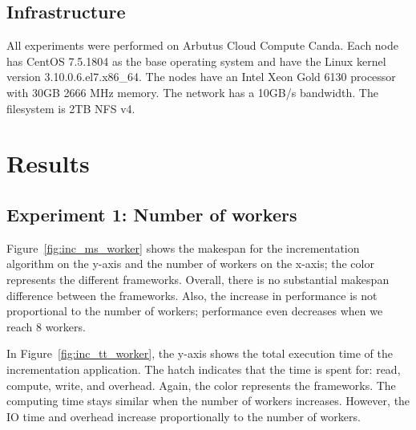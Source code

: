 \documentclass[conference]{IEEEtran}
\begin{document}
\subsection{Infrastructure}
All experiments were performed on Arbutus Cloud Compute Canda. Each node has CentOS
7.5.1804 as the base operating system and have the Linux kernel version
3.10.0.6.el7.x86\_64. The nodes have an Intel Xeon Gold 6130 processor with
30GB 2666 MHz memory. The network has a 10GB/s bandwidth. The filesystem is 2TB NFS
v4.



\section{Results}

\subsection{Experiment 1: Number of workers}
Figure~\ref{fig:inc_ms_worker} shows the makespan for the incrementation algorithm on
the y-axis and the number of workers on the x-axis; the color represents the
different frameworks. Overall, there is no substantial makespan difference between
the frameworks. Also, the increase in performance is not proportional to the number
of workers; performance even decreases when we reach 8 workers.

In Figure~\ref{fig:inc_tt_worker}, the y-axis shows the total execution time of the
incrementation application. The hatch indicates that the time is spent for: read,
compute, write, and overhead. Again, the color represents the frameworks. The
computing time stays similar when the number of workers increases. However, the IO
time and overhead increase proportionally to the number of workers.
\end{document}
